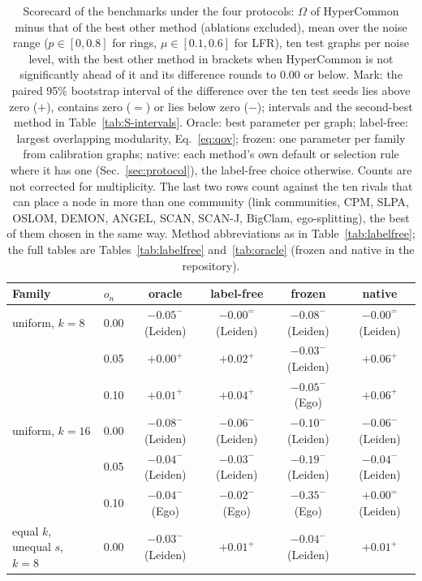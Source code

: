 \begin{table}[t]
\caption{Scorecard of the benchmarks under the four protocols: $\Omega$ of HyperCommon minus that of the best other method (ablations excluded), mean over the noise range ($p\in[0,0.8]$ for rings, $\mu\in[0.1,0.6]$ for LFR), ten test graphs per noise level, with the best other method in brackets when HyperCommon is not significantly ahead of it and its difference rounds to 0.00 or below. Mark: the paired 95\% bootstrap interval of the difference over the ten test seeds lies above zero ($+$), contains zero ($=$) or lies below zero ($-$); intervals and the second-best method in Table~\ref{tab:S-intervals}. Oracle: best parameter per graph; label-free: largest overlapping modularity, Eq.~\eqref{eq:qov}; frozen: one parameter per family from calibration graphs; native: each method's own default or selection rule where it has one (Sec.~\ref{sec:protocol}), the label-free choice otherwise. Counts are not corrected for multiplicity. The last two rows count against the ten rivals that can place a node in more than one community (link communities, CPM, SLPA, OSLOM, DEMON, ANGEL, SCAN, SCAN-J, BigClam, ego-splitting), the best of them chosen in the same way. Method abbreviations as in Table~\ref{tab:labelfree}; the full tables are Tables~\ref{tab:labelfree} and~\ref{tab:oracle} (frozen and native in the repository).}
\label{tab:scorecard}
\scriptsize\setlength{\tabcolsep}{3pt}
\begin{ruledtabular}
\begin{tabular}{llcccc}
Family & $o_n$ & oracle & label-free & frozen & native \\
\hline
uniform, $k{=}8$ & 0.00 & $-0.05^{-}$ (Leiden) & $-0.00^{=}$ (Leiden) & $-0.08^{-}$ (Leiden) & $-0.00^{=}$ (Leiden) \\
 & 0.05 & $+0.00^{+}$ & $+0.02^{+}$ & $-0.03^{-}$ (Leiden) & $+0.06^{+}$ \\
 & 0.10 & $+0.01^{+}$ & $+0.04^{+}$ & $-0.05^{-}$ (Ego) & $+0.06^{+}$ \\
\hline
uniform, $k{=}16$ & 0.00 & $-0.08^{-}$ (Leiden) & $-0.06^{-}$ (Leiden) & $-0.10^{-}$ (Leiden) & $-0.06^{-}$ (Leiden) \\
 & 0.05 & $-0.04^{-}$ (Leiden) & $-0.03^{-}$ (Leiden) & $-0.19^{-}$ (Leiden) & $-0.04^{-}$ (Leiden) \\
 & 0.10 & $-0.04^{-}$ (Ego) & $-0.02^{-}$ (Ego) & $-0.35^{-}$ (Ego) & $+0.00^{=}$ (Leiden) \\
\hline
equal $k$, unequal $s$, $k{=}8$ & 0.00 & $-0.03^{-}$ (Leiden) & $+0.01^{+}$ & $-0.04^{-}$ (Leiden) & $+0.01^{+}$ \\

\end{tabular}
\end{ruledtabular}
\end{table}
